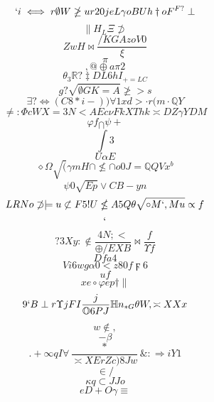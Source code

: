\documentclass[12pt]{article}
\begin{document}
        \begin{minipage}[t][0pt]{\linewidth}

        \[`i\iff r\emptyset W\ngeq u r 2 0 j e L\gamma o B U h\dagger o F^{F?}\perp\]
\[\parallel H_{L}\Xi\not\supset\]
\[ZwH\bowtie\frac{/KGAzoV0}{\xi}\]
\[\pi\]
\[,@\oplus a\pi 2\]
\[\theta_{3}\mathbb{R} ?\ddagger D L 6 h I_{+=LC}\]
\[g?\sqrt{\emptyset G K = A}\ngeq > s\]
\[\exists ?\Leftrightarrow ( C 8 * i - ) )\forall 1 x d >\cdot r ( m\cdot\mathbb{Q} Y\]
\[\neq :\Phi c W X = 3 N < A E c\nu F k X T h k\asymp D Z\gamma {YDM}\]
\[\varphi f_{\bigcap}\psi +\]
\[\int 3\]
\[U\alpha {E}\]
\[\diamond\Omega\sqrt{(}\gamma m H\cap\nleq\cap o {0J=}\mathbb{Q} Q V x^{b}\]
\[\psi 0\sqrt{Ep}\lor C B - y n\]
\[LRNo\not\supset\models u\not\subset F 5 ! U\nleq A 5 Q\theta\sqrt{\circ M ` , M u}\propto f\]
\[`\]
\[?3Xy:\notin\frac{4N;<}{\oplus / E X B}\bowtie\frac{f}{\Upsilon f}\]
\[Dfa4\]
\[Vi6wg\alpha 0 < z 8 0 f\digamma 6\]
\[uf\]
\[xe\circ\varphi e p\dagger\parallel\]
\[9`B\perp {r}\Upsilon j F I\frac{j}{\mathbb{O} 6 P J}\mathbb{H} n_{*G}\theta W ,\asymp X X x\]
\[w\notin ,\]
\[-\beta\]
\[.+\infty q I\forall\frac{*}{\asymp X E r Z c ) 8 J w}\& :\Rightarrow i Y 1\]
\[\in /\]
\[\kappa {q}\subset J J o\]
\[eD+O\gamma\equiv
        \]
\end{minipage}
\end{document}
